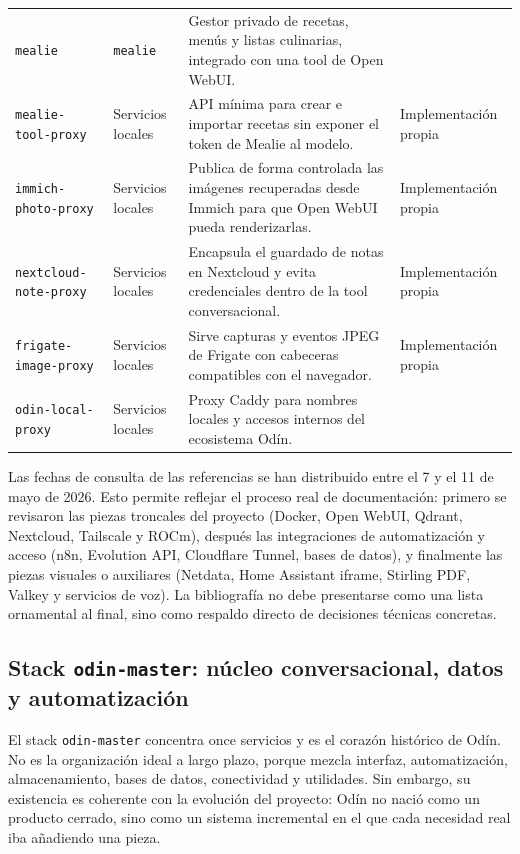 \begin{longtable}{p{}p{}p{}p{}}
  \texttt{mealie} & \texttt{mealie} & Gestor privado de recetas, menús y listas culinarias, integrado con una tool de Open WebUI. & \citep{mealieDocs} \\
  \texttt{mealie-tool-proxy} & Servicios locales & API mínima para crear e importar recetas sin exponer el token de Mealie al modelo. & Implementación propia \\
  \texttt{immich-photo-proxy} & Servicios locales & Publica de forma controlada las imágenes recuperadas desde Immich para que Open WebUI pueda renderizarlas. & Implementación propia \\
  \texttt{nextcloud-note-proxy} & Servicios locales & Encapsula el guardado de notas en Nextcloud y evita credenciales dentro de la tool conversacional. & Implementación propia \\
  \texttt{frigate-image-proxy} & Servicios locales & Sirve capturas y eventos JPEG de Frigate con cabeceras compatibles con el navegador. & Implementación propia \\
  \texttt{odin-local-proxy} & Servicios locales & Proxy Caddy para nombres locales y accesos internos del ecosistema Odín. & \citep{caddyDocs} \\
\end{longtable}
\endgroup

Las fechas de consulta de las referencias se han distribuido entre el 7 y el 11 de mayo de 2026. Esto permite reflejar el proceso real de documentación: primero se revisaron las piezas troncales del proyecto (Docker, Open WebUI, Qdrant, Nextcloud, Tailscale y ROCm), después las integraciones de automatización y acceso (n8n, Evolution API, Cloudflare Tunnel, bases de datos), y finalmente las piezas visuales o auxiliares (Netdata, Home Assistant iframe, Stirling PDF, Valkey y servicios de voz). La bibliografía no debe presentarse como una lista ornamental al final, sino como respaldo directo de decisiones técnicas concretas.

\subsection{Stack \texttt{odin-master}: núcleo conversacional, datos y automatización}
El stack \texttt{odin-master} concentra once servicios y es el corazón histórico de Odín. No es la organización ideal a largo plazo, porque mezcla interfaz, automatización, almacenamiento, bases de datos, conectividad y utilidades. Sin embargo, su existencia es coherente con la evolución del proyecto: Odín no nació como un producto cerrado, sino como un sistema incremental en el que cada necesidad real iba añadiendo una pieza.

